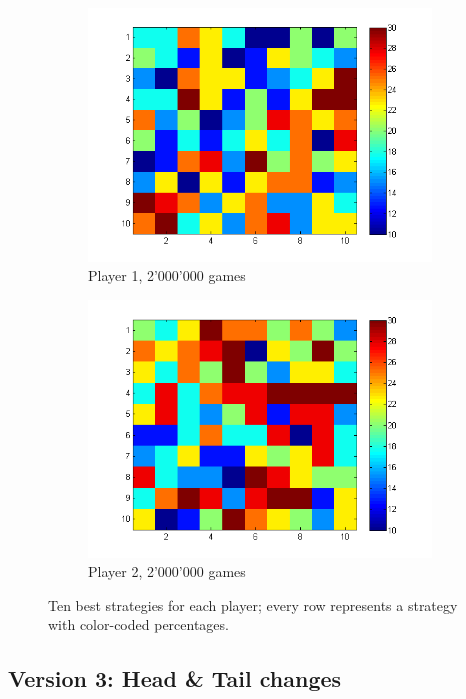 \documentclass[11pt]{article}
\begin{document}
\begin{figure}[h]
\begin{subfigure}[b]{0.4\textwidth}
		\includegraphics[width=\textwidth]{player_1_best_strategies_V2_2}
		\caption{Player 1, 2'000'000 games}
		\label{p1 best strat v2.2}
	\end{subfigure}
	\begin{subfigure}[b]{0.4\textwidth}
		\includegraphics[width=\textwidth]{player_2_best_strategies_V2_2}
		\caption{Player 2, 2'000'000 games}
		\label{p1 best strat v2.2}
	\end{subfigure}
	\caption{Ten best strategies for each player; every row represents a strategy with color-coded percentages.}
	\label{best strat v2}
\end{figure}


\subsection{Version 3: Head \& Tail changes}
\end{document}
